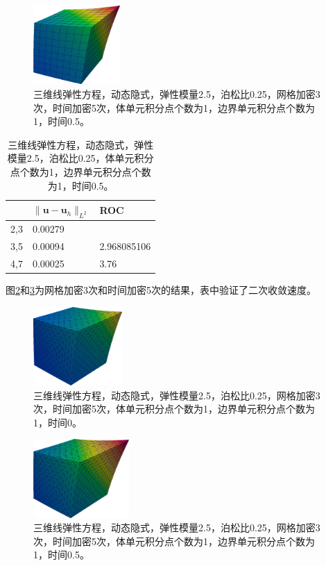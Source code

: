 \begin{figure}[!htbp]
  \centering
  \includegraphics[height=3cm]{fig/4/4.1.4/2.png}
  \caption{三维线弹性方程，动态隐式，弹性模量2.5，泊松比0.25，网格加密3次，时间加密5次，体单元积分点个数为1，边界单元积分点个数为1，时间0.5。}
  \label{fig:4.1.4:2}
\end{figure}


\begin{table}[!htbp]
  \centering
  \begin{tabular}{c|l|l}
    & $\|\mathbf u-\mathbf u_h\|_{L^2}$ & ROC\\
    \hline
    2,3 & 0.00279 &  \\
    \hline
    3,5 & 0.00094    & 2.968085106 \\
    \hline
    4,7 & 0.00025   &     3.76
  \end{tabular}
  \caption{三维线弹性方程，动态隐式，弹性模量2.5，泊松比0.25，体单元积分点个数为1，边界单元积分点个数为1，时间0.5。}
\end{table}

\newpage
图\ref{fig:4.1.4:3}和\ref{fig:4.1.4:4}为网格加密3次和时间加密5次的结果，表中验证了二次收敛速度。

\begin{figure}[!htbp]
  \centering
  \includegraphics[height=3cm]{fig/4/4.1.4/3.png}
  \caption{三维线弹性方程，动态隐式，弹性模量2.5，泊松比0.25，网格加密3次，时间加密5次，体单元积分点个数为1，边界单元积分点个数为1，时间0。}
  \label{fig:4.1.4:3}
\end{figure}

\begin{figure}[!htbp]
  \centering
  \includegraphics[height=3cm]{fig/4/4.1.4/4.png}
  \caption{三维线弹性方程，动态隐式，弹性模量2.5，泊松比0.25，网格加密3次，时间加密5次，体单元积分点个数为1，边界单元积分点个数为1，时间0.5。}
  \label{fig:4.1.4:4}
\end{figure}


